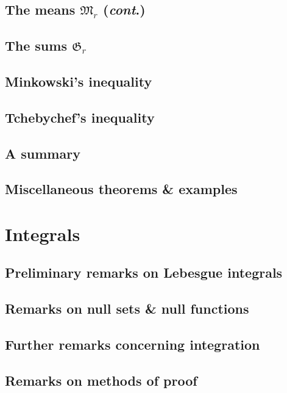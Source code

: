\documentclass[oneside]{book}
\numberwithin{equation}{section}
\begin{document}
\subsection{The means $\mathfrak{M}_r$ (\textit{cont}.)}

\subsection{The sums $\mathfrak{G}_r$}

\subsection{Minkowski's inequality}

\subsection{Tchebychef's inequality}

\subsection{A summary}

\subsection{Miscellaneous theorems \& examples}


\section{Integrals}

\subsection{Preliminary remarks on Lebesgue integrals}

\subsection{Remarks on null sets \& null functions}

\subsection{Further remarks concerning integration}

\subsection{Remarks on methods of proof}
\end{document}
